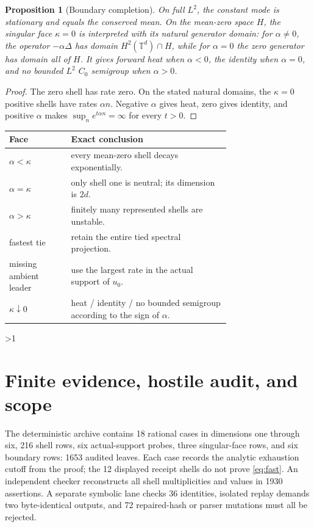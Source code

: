 \documentclass[10pt]{article}
\providecommand{\CRevisionRound}{2}
\newtheorem{proposition}{Proposition}
\newcommand{\T}{\mathbb T}
\begin{document}
\begin{proposition}[Boundary completion]\label{prop:boundary}
On full $L^2$, the constant mode is stationary and equals the conserved
mean. On the mean-zero space $H$, the singular face $\kappa=0$ is
interpreted with its natural generator domain: for $\alpha\ne0$, the
operator $-\alpha\Delta$ has domain $H^2(\T^d)\cap H$, while for
$\alpha=0$ the zero generator has domain all of $H$. It gives forward heat
when $\alpha<0$, the identity when $\alpha=0$, and no bounded $L^2$ $C_0$
semigroup when $\alpha>0$.
\end{proposition}
\begin{proof}
The zero shell has rate zero. On the stated natural domains, the
$\kappa=0$ positive shells have rates $\alpha n$. Negative $\alpha$ gives
heat, zero gives identity, and positive $\alpha$ makes
$\sup_ne^{t\alpha n}=\infty$ for every $t>0$.
\end{proof}

\begin{center}\small
\begin{tabular}{@{}lp{0.72\linewidth}@{}}
\toprule
Face & Exact conclusion \\
\midrule
$\alpha<\kappa$ & every mean-zero shell decays exponentially. \\
$\alpha=\kappa$ & only shell one is neutral; its dimension is $2d$. \\
$\alpha>\kappa$ & finitely many represented shells are unstable. \\
fastest tie & retain the entire tied spectral projection. \\
missing ambient leader & use the largest rate in the actual support of $u_0$. \\
$\kappa\downarrow0$ & heat / identity / no bounded semigroup according to the sign of $\alpha$. \\
\bottomrule
\end{tabular}
\end{center}
\fi

\ifnum\CRevisionRound>1
\section{Finite evidence, hostile audit, and scope}
The deterministic archive contains 18 rational cases in dimensions one
through six, 216 shell rows, six actual-support probes, three singular-face
rows, and six boundary rows: 1653 audited leaves. Each case records the
analytic exhaustion cutoff from the proof; the 12 displayed receipt shells
do not prove \eqref{eq:fast}. An independent checker reconstructs all shell
multiplicities and values in 1930 assertions. A separate symbolic lane
checks 36 identities, isolated replay demands two byte-identical outputs,
and 72 repaired-hash or parser mutations must all be rejected.
\end{document}
